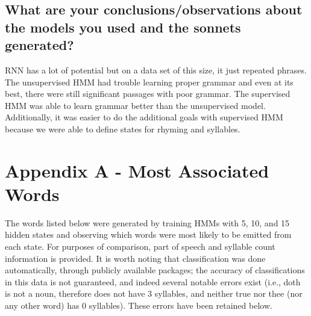 \subsection{What are your conclusions/observations about the models you used and the sonnets generated?}
RNN has a lot of potential but on a data set of this size, it just repeated phrases. The unsupervised HMM had trouble learning proper grammar and even at its best, there were still significant passages with poor grammar. The supervised HMM was able to learn grammar better than the unsupervised model. Additionally, it was easier to do the additional goals with supervised HMM because we were able to define states for rhyming and syllables. 

\pagebreak
\section{Appendix A - Most Associated Words}
The words listed below were generated by training HMMs with 5, 10, and 15 hidden states and observing which words were most likely to be emitted from each state. For purposes of comparison, part of speech and syllable count information is provided. It is worth noting that classification was done automatically, through publicly available packages; the accuracy of classifications in this data is not guaranteed, and indeed several notable errors exist (i.e., doth is not a noun, therefore does not have 3 syllables, and neither true nor thee (nor any other word) has 0 syllables). These errors have been retained below.

